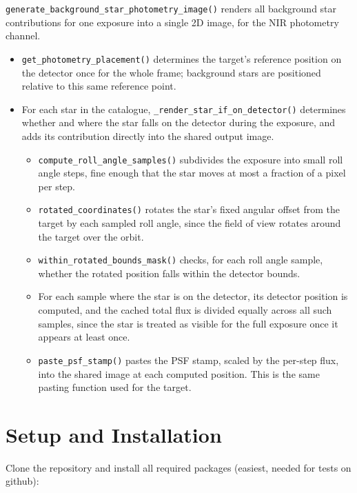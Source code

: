 \texttt{generate\_background\_star\_photometry\_image()} renders all background star contributions for one exposure into a single 2D image, for the NIR photometry channel.

\begin{itemize}
    \item \texttt{get\_photometry\_placement()} determines the target's reference position on the detector once for the whole frame; background stars are positioned relative to this same reference point.

    \item For each star in the catalogue, \texttt{\_render\_star\_if\_on\_detector()} determines whether and where the star falls on the detector during the exposure, and adds its contribution directly into the shared output image.
          \begin{itemize}
              \item \texttt{compute\_roll\_angle\_samples()} subdivides the exposure into small roll angle steps, fine enough that the star moves at most a fraction of a pixel per step.
              \item \texttt{rotated\_coordinates()} rotates the star's fixed angular offset from the target by each sampled roll angle, since the field of view rotates around the target over the orbit.
              \item \texttt{within\_rotated\_bounds\_mask()} checks, for each roll angle sample, whether the rotated position falls within the detector bounds.
              \item For each sample where the star is on the detector, its detector position is computed, and the cached total flux is divided equally across all such samples, since the star is treated as visible for the full exposure once it appears at least once.
              \item \texttt{paste\_psf\_stamp()} pastes the PSF stamp, scaled by the per-step flux, into the shared image at each computed position. This is the same pasting function used for the target.
          \end{itemize}
\end{itemize}
\newpage

\section{Setup and Installation}

Clone the repository and install all required packages (easiest, needed for tests on github):

